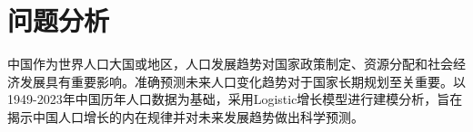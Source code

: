 \section{问题分析}

中国作为世界人口大国或地区，人口发展趋势对国家政策制定、资源分配和社会经济发展具有重要影响。准确预测未来人口变化趋势对于国家长期规划至关重要。以1949-2023年中国历年人口数据为基础，采用Logistic增长模型进行建模分析，旨在揭示中国人口增长的内在规律并对未来发展趋势做出科学预测。
